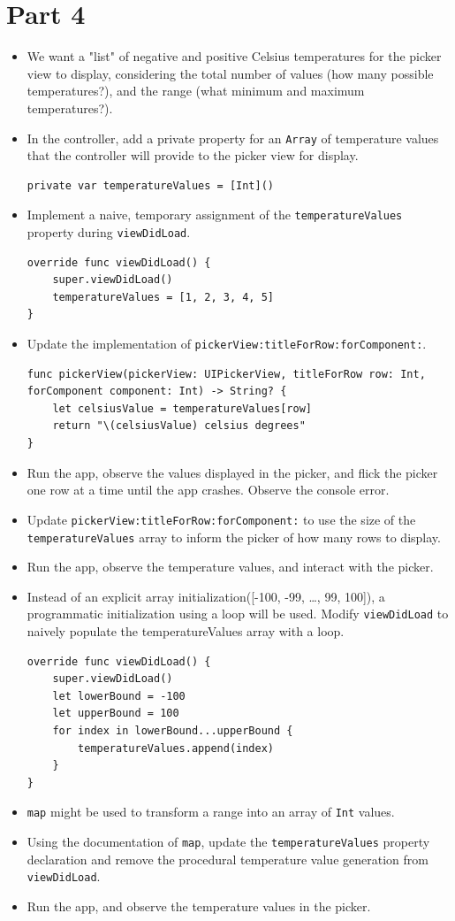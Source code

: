 \documentclass[a4paper,11pt]{scrartcl}
\begin{document}
\section*{Part 4}

\begin{itemize}
\item We want a "list" of negative and positive Celsius temperatures for the picker view to display, considering the total number of values (how many possible temperatures?), and the range (what minimum and maximum temperatures?).
\item In the controller, add a private property for an \texttt{Array} of temperature values that the controller will provide to the picker view for display.
\begin{lstlisting}
private var temperatureValues = [Int]()
\end{lstlisting}
\item Implement a naive, temporary assignment of the \texttt{temperatureValues} property during \texttt{viewDidLoad}.
\begin{lstlisting}
override func viewDidLoad() {
	super.viewDidLoad()
	temperatureValues = [1, 2, 3, 4, 5]
}
\end{lstlisting}
\item Update the implementation of \texttt{pickerView:titleForRow:forComponent:}.
\begin{lstlisting}
func pickerView(pickerView: UIPickerView, titleForRow row: Int, forComponent component: Int) -> String? {
	let celsiusValue = temperatureValues[row]
	return "\(celsiusValue) celsius degrees"
}
\end{lstlisting}
\item Run the app, observe the values displayed in the picker, and flick the picker one row at a time until the app crashes. Observe the console error.
\item Update \texttt{pickerView:titleForRow:forComponent:} to use the size of the \texttt{temperatureValues} array to inform the picker of how many rows to display.
\item Run the app, observe the temperature values, and interact with the picker.
\item Instead of an explicit array initialization([-100, -99, …, 99, 100]), a programmatic initialization using a loop will be used. Modify \texttt{viewDidLoad} to naively populate the temperatureValues array with a loop.
\begin{lstlisting}
override func viewDidLoad() {
	super.viewDidLoad()
	let lowerBound = -100
	let upperBound = 100
	for index in lowerBound...upperBound {
		temperatureValues.append(index)
	}
}
\end{lstlisting}
\item \texttt{map} might be used to transform a range into an array of \texttt{Int} values.
\item Using the documentation of \texttt{map}, update the \texttt{temperatureValues} property declaration and remove the procedural temperature value generation from \texttt{viewDidLoad}.
\item Run the app, and observe the temperature values in the picker.
\end{itemize}
\end{document}
